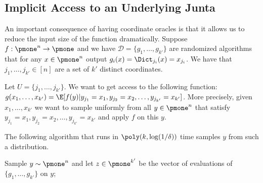 \subsection{Implicit Access to an Underlying Junta}
An important consequence of having coordinate oracles is that it allows us to reduce the input size of the function dramatically. Suppose $f: \pmone^n \to \pmone$ and we have $\mathcal{D} = \{g_1, \ldots, g_{{k'}}\}$ are randomized algorithms that for any $x\in \pmone^n$ output $g_i(x) = \Dict_{j_i}(x) = x_{j_i}$.
We have that $j_1, \ldots, j_{k'} \in [n]$ are a set of ${k'}$ distinct coordinates.

Let $U = \{j_1, \ldots, j_{k'}\}$.
We want to get access to the following function:
$g(x_1, \ldots, x_{k'}) = \E[f(y)| y_{j_1}=x_1, y_{j_2} = x_2, \ldots, y_{j_{k'}} = x_{{k'}}]$. More precisely, given $x_1, \ldots, x_{{k'}}$ we want to sample uniformly from all $y\in \pmone^n$ that satisfy $y_{j_1}=x_1, y_{j_2} = x_2, \ldots, y_{j_{k'}} = x_{{k'}}$ and apply $f$ on this $y$.

The following algorithm that runs in $\poly(k, \log(1/\delta))$ time samples  $y$ from such a distribution. 

\begin{algorithm}[H]
\DontPrintSemicolon
  Sample $y \sim \pmone^{n}$ and let $z \in \pmone^{k'}$ be the vector of evaluations of $\{g_1, \ldots, g_{k'}\}$ on $y$; \\
\caption{Sampling a uniformly random input consistent with the oracles' values}
\label{alg:sampling}
\end{algorithm}

